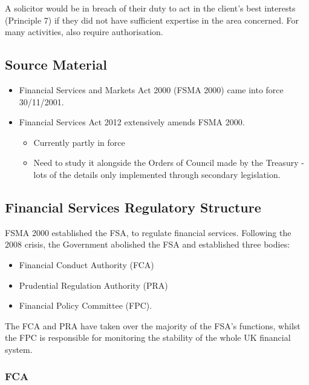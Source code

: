 \documentclass[
]{article}
\providecommand{\tightlist}{%
  \setlength{\itemsep}{0pt}\setlength{\parskip}{0pt}}
\begin{document}
A solicitor would be in breach of their duty to act in the client's best
interests (Principle 7) if they did not have sufficient expertise in the
area concerned. For many activities, also require authorisation.

\hypertarget{source-material}{%
\subsection{Source Material}\label{source-material}}

\begin{itemize}
\tightlist
\item
  Financial Services and Markets Act 2000 (FSMA 2000) came into force
  30/11/2001.
\item
  Financial Services Act 2012 extensively amends FSMA 2000.

  \begin{itemize}
  \tightlist
  \item
    Currently partly in force
  \item
    Need to study it alongside the Orders of Council made by the
    Treasury - lots of the details only implemented through secondary
    legislation.
  \end{itemize}
\end{itemize}

\hypertarget{financial-services-regulatory-structure}{%
\subsection{Financial Services Regulatory
Structure}\label{financial-services-regulatory-structure}}

FSMA 2000 established the FSA, to regulate financial services. Following
the 2008 crisis, the Government abolished the FSA and established three
bodies:

\begin{itemize}
\tightlist
\item
  Financial Conduct Authority (FCA)
\item
  Prudential Regulation Authority (PRA)
\item
  Financial Policy Committee (FPC).
\end{itemize}

The FCA and PRA have taken over the majority of the FSA's functions,
whilst the FPC is responsible for monitoring the stability of the whole
UK financial system.

\hypertarget{fca}{%
\subsubsection{FCA}\label{fca}}
\end{document}
